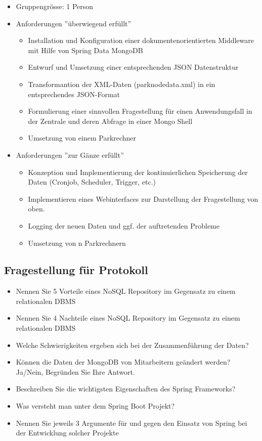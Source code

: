\begin{itemize}
    \item Gruppengrösse: 1 Person
    \item Anforderungen ''überwiegend erfüllt''
    \begin{itemize}
        \item Installation und Konfiguration einer dokumentenorientierten Middleware mit Hilfe von Spring Data MongoDB
        \item Entwurf und Umsetzung einer entsprechenden JSON Datenstruktur
        \item Transformantion der XML-Daten (parknodedata.xml) in ein entsprechendes JSON-Format
        \item Formulierung einer sinnvollen Fragestellung für einen Anwendungsfall in der Zentrale und deren Abfrage in einer Mongo Shell
        \item Umsetzung von einem Parkrechner
    \end{itemize}
    \item Anforderungen ''zur Gänze erfüllt''
    \begin{itemize}
        \item Konzeption und Implementierung der kontinuierlichen Speicherung der Daten (Cronjob, Scheduler, Trigger, etc.)
        \item Implementieren eines Webinterfaces zur Darstellung der Fragestellung von oben.
        \item Logging der neuen Daten und ggf. der auftretenden Probleme
        \item Umsetzung von n Parkrechnern
    \end{itemize}
\end{itemize}

\subsection{Fragestellung für Protokoll}

\begin{itemize}
    \item Nennen Sie 5 Vorteile eines NoSQL Repository im Gegensatz zu einem relationalen DBMS
    \item Nennen Sie 4 Nachteile eines NoSQL Repository im Gegensatz zu einem relationalen DBMS
    \item Welche Schwierigkeiten ergeben sich bei der Zusammenführung der Daten?
    \item Können die Daten der MongoDB von Mitarbeitern geändert werden?
        Ja/Nein, Begründen Sie Ihre Antwort.
    \item Beschreiben Sie die wichtigsten Eigenschaften des Spring Frameworks?
    \item Was versteht man unter dem Spring Boot Projekt?
    \item Nennen Sie jeweils 3 Argumente für und gegen den Einsatz von Spring bei der Entwicklung solcher Projekte
\end{itemize}
